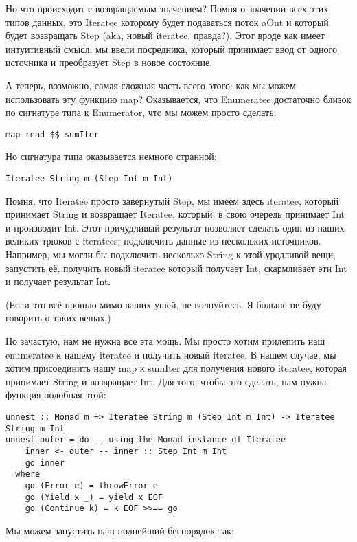 Но что происходит с возвращаемым значением? Помня о значении всех этих типов данных, это Iteratee которому будет подаваться поток aOut и который будет возвращать Step (aka, новый iteratee, правда?). Этот вроде как имеет интуитивный смысл: мы ввели посредника, который принимает ввод от одного источника и преобразует Step в новое состояние.

А теперь, возможно, самая сложная часть всего этого: как мы можем использовать эту функцию map? Оказывается, что Enumeratee достаточно близок по сигнатуре типа к Enumerator, что мы можем просто сделать:

\begin{lstlisting}
map read $$ sumIter
\end{lstlisting}

Но сигнатура типа оказывается немного странной:

\begin{lstlisting}
Iteratee String m (Step Int m Int)
\end{lstlisting}

Помня, что Iteratee просто завернутый Step, мы имеем здесь iteratee, который принимает String и возвращает Iteratee, который, в свою очередь принимает Int и производит Int. Этот причудливый результат позволяет сделать один из наших великих трюков с iteratees: подключить данные из нескольких источников. Например, мы могли бы подключить несколько String к этой уродливой вещи, запустить её, получить новый iteratee который получает Int, скармливает эти Int и получает результат Int.

(Если это всё прошло мимо ваших ушей, не волнуйтесь. Я больше не буду говорить о таких вещах.)

Но зачастую, нам не нужна все эта мощь. Мы просто хотим прилепить наш enumeratee к нашему iteratee и получить новый iteratee. В нашем случае, мы хотим присоединить нашу map к sumIter для получения нового iteratee, которая принимает String и возвращает Int. Для того, чтобы это сделать, нам нужна функция подобная этой:

\begin{lstlisting}
unnest :: Monad m => Iteratee String m (Step Int m Int) -> Iteratee String m Int
unnest outer = do -- using the Monad instance of Iteratee
    inner <- outer -- inner :: Step Int m Int
    go inner
  where
    go (Error e) = throwError e
    go (Yield x _) = yield x EOF
    go (Continue k) = k EOF >>== go
\end{lstlisting}

Мы можем запустить наш полнейший беспорядок так:

